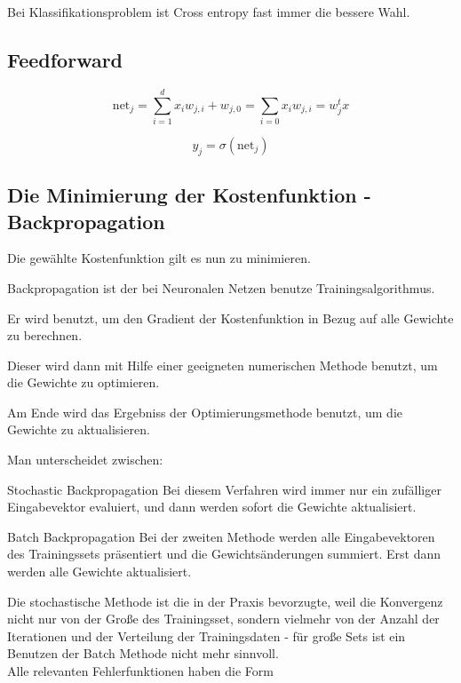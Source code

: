 Bei Klassifikationsproblem ist Cross entropy fast immer die bessere Wahl. 


\subsection{Feedforward}

\begin{equation}
\text{net}_j = \sum_{i=1}^d x_i w_{j,i} + w_{j,0} = \sum_{i=0} x_i w_{j,i} = 
w_j^t x
\end{equation}

\begin{equation}
y_j = \sigma (\text{net}_j)
\end{equation}

\cite{duda2012pattern}

\subsection{Die Minimierung der Kostenfunktion - Backpropagation}

Die gewählte Kostenfunktion gilt es nun zu minimieren. 

Backpropagation ist der bei Neuronalen Netzen benutze Trainingsalgorithmus. 

Er wird benutzt, um den Gradient der Kostenfunktion in Bezug auf alle Gewichte zu berechnen. 

Dieser wird dann mit Hilfe einer geeigneten numerischen Methode benutzt, um die Gewichte zu optimieren. 

Am Ende wird das Ergebniss der Optimierungsmethode benutzt, um die Gewichte zu aktualisieren. \cite{rumelhart1988learning}

Man unterscheidet zwischen:
\begin{LaTeXdescription}
	\item[Stochastic Backpropagation]
	Bei diesem Verfahren wird immer nur ein zufälliger Eingabevektor evaluiert, und dann werden sofort die Gewichte aktualisiert. \\
	\item[Batch Backpropagation] 
	Bei der zweiten Methode werden alle Eingabevektoren des Trainingssets präsentiert und die Gewichtsänderungen summiert. Erst dann werden alle Gewichte aktualisiert. 
\end{LaTeXdescription}\cite{duda2012pattern}

Die stochastische Methode ist die in der Praxis bevorzugte, weil die Konvergenz nicht nur von der Große des Trainingsset, sondern vielmehr von der Anzahl der Iterationen und der Verteilung der Trainingsdaten - für große Sets ist ein Benutzen der Batch Methode nicht mehr sinnvoll. \cite{bengio2012practical}  \\
Alle relevanten Fehlerfunktionen haben die Form 

